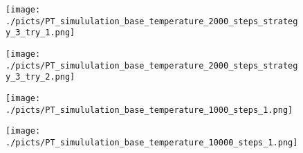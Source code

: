 
\begin{frame}[plain]

	\begin{center}
		\begin{figure}\texttt{[image: ./picts/PT\_simululation\_base\_temperature\_2000\_steps\_strategy\_3\_try\_1.png]}\end{figure}	
	\end{center}	
		
\end{frame}

\begin{frame}[plain]

	\begin{center}
		\begin{figure}\texttt{[image: ./picts/PT\_simululation\_base\_temperature\_2000\_steps\_strategy\_3\_try\_2.png]}\end{figure}	
	\end{center}	
		
\end{frame}

\begin{frame}[plain]

	\begin{center}
		\begin{figure}\texttt{[image: ./picts/PT\_simululation\_base\_temperature\_1000\_steps\_1.png]}\end{figure}	
	\end{center}	
		
\end{frame}

\begin{frame}[plain]

	\begin{center}
		\begin{figure}\texttt{[image: ./picts/PT\_simululation\_base\_temperature\_10000\_steps\_1.png]}\end{figure}	
	\end{center}	
		
\end{frame}


